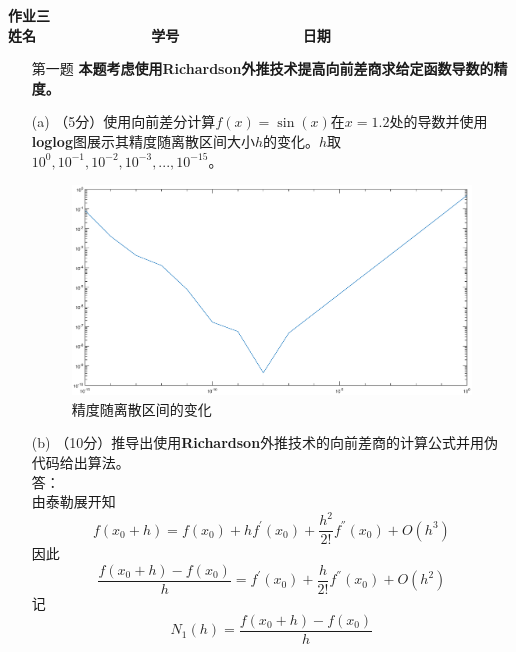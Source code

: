 \documentclass[12pt,a4paper,utf8]{ctexart}
\begin{document}
	
	
	\begin{center}
		\textbf{作业三}\\
		\textbf{姓名 ~~~~~~~~~~~~~ 学号 ~~~~~~~~~~~~~~ 日期}\\
	\end{center}
	
	\begin{center}
		\fbox{
			\begin{minipage}{40em}
				\vspace{5cm}
				\hspace{18cm}
		\end{minipage}}
	\end{center}
	\vspace{1cm}
	
	\begin{enumerate}
		\item[第一题] \textbf{本题考虑使用Richardson外推技术提高向前差商求给定函数导数的精度。} 
		\item[(a)]（5分）使用向前差分计算$f(x) = \sin(x)$在$x = 1.2$处的导数并使用\textbf{loglog}图展示其精度随离散区间大小$h$的变化。$h$取$10^0, 10^{−1},10^{−2},10^{−3},...,10^{−15}$。\\
		\begin{figure}[H]  
			\centering
			\includegraphics[width=\textwidth]{loglog1}
			\caption{精度随离散区间的变化}  
			\label{1}  
		\end{figure}
		\item[(b)]（10分）推导出使用\textbf{Richardson}外推技术的向前差商的计算公式并用伪代码给出算法。\\
		答：\\
		由泰勒展开知$$
		f(x_{0}+h)=f(x_{0})+hf^{'}(x_{0})+\frac{h^{2}}{2!}f^{''}(x_{0})+O(h^{3})$$
		因此$$
		\frac{f(x_{0}+h)-f(x_{0})}{h}=f^{'}(x_{0})+\frac{h}{2!}f^{''}(x_{0})+O(h^2)
		$$记$$N_{1}(h)=\frac{f(x_{0}+h)-f(x_{0})}{h}$$

\end{enumerate}
\end{document}
